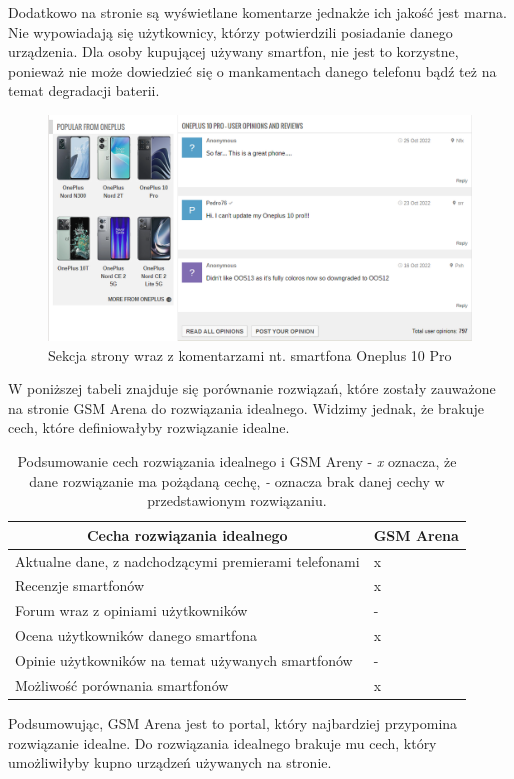 Dodatkowo na stronie są wyświetlane komentarze jednakże ich jakość jest marna. Nie wypowiadają się użytkownicy, którzy potwierdzili posiadanie danego urządzenia. Dla osoby kupującej używany smartfon, nie jest to korzystne, ponieważ nie może dowiedzieć się o mankamentach danego telefonu bądź też na temat degradacji baterii.
\begin{figure}[H]
    \centering
    \includegraphics[width=15cm]{img/GSM Arena/Comments.png}
    \caption{Sekcja strony wraz z komentarzami nt. smartfona Oneplus 10 Pro}
    \label{GSM_Arena_4}
\end{figure}

W poniższej tabeli znajduje się porównanie rozwiązań, które zostały zauważone na stronie GSM Arena do rozwiązania idealnego. Widzimy jednak, że brakuje cech, które definiowałyby rozwiązanie idealne.
\begin{table}[H]
\centering
\begin{tabular}{|l|l|}
    \hline
    \multicolumn{1}{|c|}{Cecha rozwiązania idealnego}    & \multicolumn{1}{c|}{GSM Arena} \\ \hline
    Aktualne dane, z nadchodzącymi premierami telefonami & x                             \\ \hline
    Recenzje smartfonów                                  & x                                \\ \hline
    Forum wraz z opiniami użytkowników                   & -                                \\ \hline
    Ocena użytkowników danego smartfona                  & x                             \\ \hline
    Opinie użytkowników na temat używanych smartfonów    & -                                 \\ \hline
    Możliwość porównania smartfonów                      & x                                \\ \hline
\end{tabular}
\caption{Podsumowanie cech rozwiązania idealnego i GSM Areny - \textit{x} oznacza, że dane rozwiązanie ma pożądaną cechę, \textit{-} oznacza brak danej cechy w przedstawionym rozwiązaniu.}
\label{comparison_gsm_arena}
\end{table}
Podsumowując, GSM Arena jest to portal, który najbardziej przypomina rozwiązanie idealne. Do rozwiązania idealnego brakuje mu cech, który umożliwiłyby kupno urządzeń używanych na stronie.

